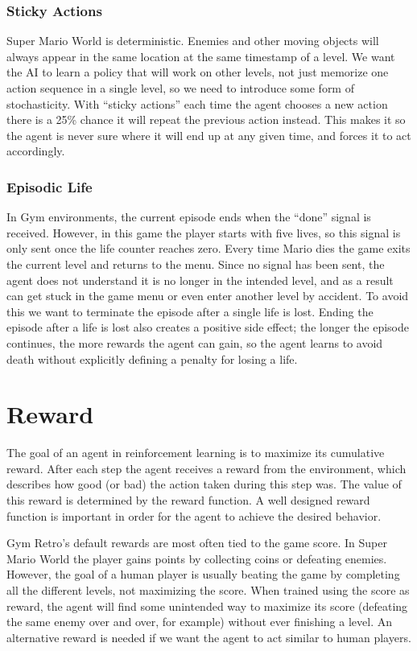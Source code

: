 \documentclass[11pt,a4paper]{article}
\begin{document}
\subsubsection{Sticky Actions}
Super Mario World is deterministic. 
Enemies and other moving objects will always appear in the same location at the same timestamp of a level.
We want the AI to learn a policy that will work on other levels, not just memorize one action sequence in a single level, so we need to introduce some form of stochasticity.
With ``sticky actions'' \cite{machado2018revisiting} each time the agent chooses a new action there is a 25\% chance it will repeat the previous action instead.
This makes it so the agent is never sure where it will end up at any given time, and forces it to act accordingly.

\subsubsection{Episodic Life}
In Gym environments, the current episode ends when the ``done'' signal is received.
However, in this game the player starts with five lives, so this signal is only sent once the life counter reaches zero.
Every time Mario dies the game exits the current level and returns to the menu.
Since no signal has been sent, the agent does not understand it is no longer in the intended level, and as a result can get stuck in the game menu or even enter another level by accident.
To avoid this we want to terminate the episode after a single life is lost.
Ending the episode after a life is lost also creates a positive side effect; the longer the episode continues, the more rewards the agent can gain, so the agent learns to avoid death without explicitly defining a penalty for losing a life.

\section{Reward}
The goal of an agent in reinforcement learning is to maximize its cumulative reward.
After each step the agent receives a reward from the environment, which describes how good (or bad) the action taken during this step was.
The value of this reward is determined by the reward function.
A well designed reward function is important in order for the agent to achieve the desired behavior.

Gym Retro's default rewards are most often tied to the game score.
In Super Mario World the player gains points by collecting coins or defeating enemies.
However, the goal of a human player is usually beating the game by completing all the different levels, not maximizing the score.
When trained using the score as reward, the agent will find some unintended way to maximize its score (defeating the same enemy over and over, for example) without ever finishing a level.
An alternative reward is needed if we want the agent to act similar to human players.
\end{document}
